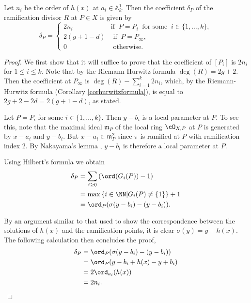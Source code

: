     \begin{lem}\label{char2ramification}
    Let $n_i$ be the order of $h(x)$ at $a_i\in \mathbb A_k^1$.
    Then the coefficient $\delta_P$ of the ramification divisor $R$ at $P\in X$ is given by
        \[
        \delta_P = \left\{
            \begin{array}{ll}
            2n_i & \text{if }\ P=P_i\ \text{ for some }\ i \in \{1,\ldots ,k\}, \\
            2(g+1-d) & \text{ if }\  P=P_\infty, \\
            0 & \text{ otherwise.} 
            \end{array}
        \right.
        \]
    \end{lem}
    \begin{proof}
    We first show that it will suffice to prove that the coefficient of $[P_i]$ is $2n_i$ for $1\leq i \leq k$.
    Note that by the Riemann-Hurwitz formula $\deg(R) = 2g+2$.
    Then the coefficient at $P_\infty$ is $\deg(R) - \sum_{i=1}^k2n_i$, which, by the Riemann-Hurwitz formula (Corollary \ref{corhurwitzformula}), is equal to $2g+2-2d = 2(g+1-d)$, as stated.
    
    Let $P=P_i$ for some $i\in \{1,\ldots , k\}$.
    Then $y-b_i$ is a local parameter at $P$.
    To see this, note that the maximal ideal $\mathfrak m_{P}$ of the local ring $\cO_{X,P}$ at $P$ is generated by $x-a_i$ and $y-b_i$.
    But $x-a_i\in \mathfrak m_{P}^2$ since $\pi$ is ramified at $P$ with ramification index 2.
    By Nakayama's lemma \cite[Prop. 2.6]{atiyahmacdonald}, $y-b_i$ is therefore a local parameter at $P$.
    
    Using Hilbert's formula \cite[Chap. IV, \S 1, Prop. 4]{localfields} we obtain
        \begin{align*}
        \delta_P & =  \sum_{i\geq 0} \left(\ord(G_i(P))-1\right) \\
        & =  \max\left\{ i\in \NN | G_i(P)\neq \{1\}\right\} + 1 \\
        & =  \ord_{P}(\sigma(y-b_i) - (y-b_i)).
        \end{align*}
    
    By an argument similar to that used to show the correspondence between the solutions of $h(x)$ and the ramification points, it is clear $\sigma(y)=y+h(x)$.
    The following calculation then concludes the proof,
        \begin{align*}
        \delta_P & =  \ord_{P}(\sigma(y-b_i) - (y-b_i)) \\
        & =  \ord_{P}(y-b_i+h(x) - y + b_i) \\
        & =  2\ord_{a_i}(h(x)) \\
        & =  2n_i.
        \end{align*}
    \end{proof}



